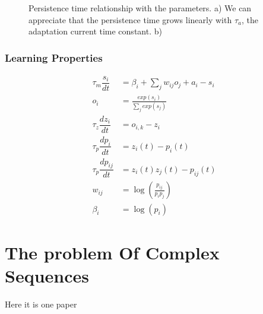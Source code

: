 \documentclass[10pt,a4paper]{article}
\begin{document}
\begin{figure}[H]%
    \centering
    \qquad
    \hfill
     \qquad
    \caption{Persistence time relationship with the parameters. a) We can appreciate that the persistence time grows linearly with $\tau_a$, the adaptation current time constant. b)   }
    \label{fig:simple_bcpnn_comparison}%
\end{figure}

\subsubsection{Learning Properties}


\begin{align*}
\tau_m \dfrac{s_i}{dt} &= \beta_i + \sum_{j} w_{ij} o_j + a_i - s_i \\
o_i &= \frac{exp(s_i)}{\sum_j exp(s_j)} \\
\tau_z \dfrac{dz_i}{dt} &= o_{i, k} - z_{i} \\
\tau_p \dfrac{dp_i}{dt} &= z_i(t) - p_i(t)  \\  
\tau_p \dfrac{dp_{ij}}{dt} &= z_i(t) z_j(t) - p_{ij}(t)\\
w_{ij} &= \log(\frac{p_{ij}}{p_i p_j}) \\
\beta_i &= \log(p_i) 
\end{align*}


\section{The problem Of Complex Sequences}
Here it is one paper \cite{guyon1988storage}



\end{document}
